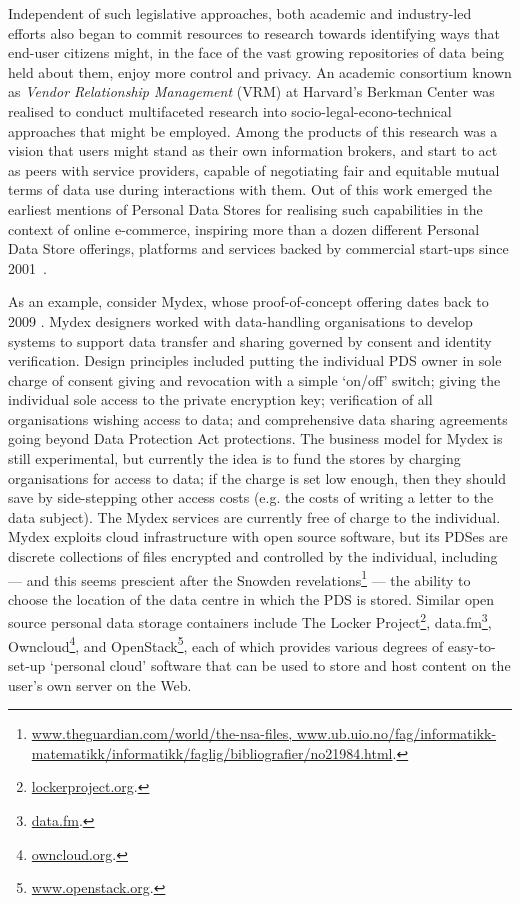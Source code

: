 \documentclass{acm_proc_article-sp}
\begin{document}
Independent of such legislative approaches, both academic and industry-led efforts also began to commit resources to research towards identifying ways that end-user citizens might, in the face of the vast growing repositories of data being held about them, enjoy more control and privacy. An academic consortium known as \emph{Vendor Relationship Management} (VRM) at Harvard's Berkman Center was realised to conduct multifaceted research into socio-legal-econo-technical approaches that might be employed. Among the products of this research was a vision that users might stand as their own information brokers, and start to act as peers with service providers, capable of negotiating fair and equitable mutual terms of data use during interactions with them\cite{agustin2001vendor}. Out of this work emerged the earliest mentions of Personal Data Stores for realising such capabilities in the context of online e-commerce, inspiring more than a dozen different Personal Data Store offerings, platforms and services backed by commercial start-ups since 2001~\cite{ctrlshift}. 

As an example, consider Mydex, whose proof-of-concept offering dates back to 2009 \cite{heath2013}. Mydex designers worked with data-handling organisations to develop systems to support data transfer and sharing governed by consent and identity verification. Design principles included putting the individual PDS owner in sole charge of consent giving and revocation with a simple `on/off' switch; giving the individual sole access to the private encryption key; verification of all organisations wishing access to data; and comprehensive data sharing agreements going beyond Data Protection Act protections. The business model for Mydex is still experimental, but currently the idea is to fund the stores by charging organisations for access to data; if the charge is set low enough, then they should save by side-stepping other access costs (e.g. the costs of writing a letter to the data subject). The Mydex services are currently free of charge to the individual. Mydex exploits cloud infrastructure with open source software, but its PDSes are discrete collections of files encrypted and controlled by the individual, including --- and this seems prescient after the Snowden revelations\footnote{\url{www.theguardian.com/world/the-nsa-files, www.ub.uio.no/fag/informatikk-matematikk/informatikk/faglig/bibliografier/no21984.html}.} --- the ability to choose the location of the data centre in which the PDS is stored. Similar open source personal data storage containers include The Locker Project\footnote{\url{lockerproject.org}.}, data.fm\footnote{\url{data.fm}.}, Owncloud\footnote{\url{owncloud.org}.}, and OpenStack\footnote{\url{www.openstack.org}.}, each of which provides various degrees of easy-to-set-up `personal cloud' software that can be used to store and host content on the user's own server on the Web.
\end{document}
